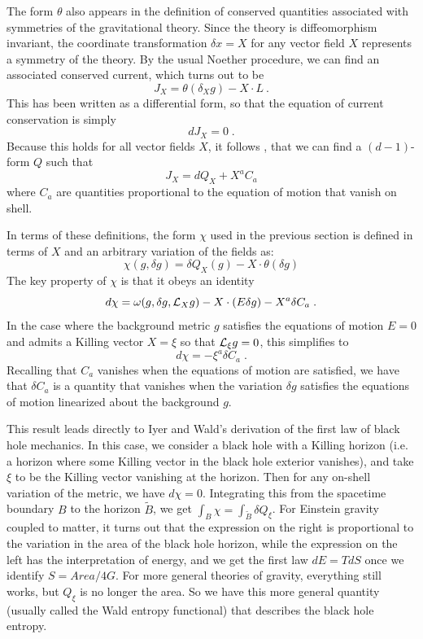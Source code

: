 \documentclass[12pt,epsf]{article}
\newcommand{\be}{\begin{equation}}
\newcommand{\ee}{\end{equation}}
\begin{document}
The form $\theta$ also appears in the definition of conserved quantities associated with symmetries of the gravitational theory. Since the theory is diffeomorphism invariant, the coordinate transformation $\delta x = X$ for any vector field $X$ represents a symmetry of the theory. By the usual Noether procedure, we can find an associated conserved current, which turns out to be
\be
J_X = \theta(\delta_X g) - X \cdot L \ .
\ee
This has been written as a differential form, so that the equation of current conservation is simply
\be
d J_X = 0 \; .
\ee
Because this holds for all vector fields $X$, it follows \cite{Iyer:1994ys}, that we can find a $(d-1)$-form $Q$ such that
\be
\label{defJ}
J_X = d Q_X + X^a C_a
\ee
where $C_a$ are quantities proportional to the equation of motion that vanish on shell.

In terms of these definitions, the form $\chi$ used in the previous section is defined in terms of $X$ and an arbitrary variation of the fields as:
\be
\label{defchi}
\chi(g, \delta g) = \delta Q_X(g) - X \cdot \theta(\delta g)
\ee
The key property of $\chi$ is that it obeys an identity
\be
\label{fundid}
d \chi = \omega(g, \delta g, {\cal L}_X g) - X \cdot (E \delta g) - X^a \delta C_a \; .
\ee
In the case where the background metric $g$ satisfies the equations of motion $E=0$ and admits a Killing vector $X = \xi$ so that ${\cal L}_\xi g = 0$, this simplifies to
\be
\label{prop3a}
d \chi = - \xi^a \delta C_a \; .
\ee
Recalling that $C_a$ vanishes when the equations of motion are satisfied, we have that $\delta C_a$ is a quantity that vanishes when the variation $\delta g$ satisfies the equations of motion linearized about the background $g$.

This result leads directly to Iyer and Wald's derivation of the first law of black hole mechanics. In this case, we consider a black hole with a Killing horizon (i.e. a horizon where some Killing vector in the black hole exterior vanishes), and take $\xi$ to be the Killing vector vanishing at the horizon. Then for any on-shell variation of the metric, we have $d \chi = 0$. Integrating this from the spacetime boundary $B$ to the horizon $\tilde{B}$, we get $\int_B \chi = \int_{\tilde{B}} \delta Q_\xi$. For Einstein gravity coupled to matter, it turns out that the expression on the right is proportional to the variation in the area of the black hole horizon, while the expression on the left has the interpretation of energy, and we get the first law $dE = T dS$ once we identify $S = Area / 4 G$. For more general theories of gravity, everything still works, but $Q_\xi$ is no longer the area. So we have this more general quantity (usually called the Wald entropy functional) that describes the black hole entropy.
\end{document}

